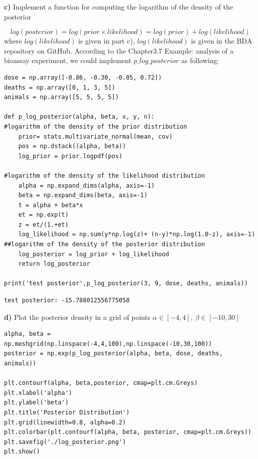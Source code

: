 \documentclass{article}
\begin{document}
\textbf{c)} Implement a function for computing the logarithm of the density of the posterior

\begin{equation}
log(posterior)=log(prior\times likelihood)=log(prior)+log(likelihood)
\end{equation}
where $log(likelihood)$ is given in part c), $log(likelihood)$ is given in the BDA repository on GitHub. According to the Chapter3.7 Example: analysis of a bioassay experiment, we could implement $p\_log\_posterior$ as following: 
\begin{verbatim}  
dose = np.array([-0.86, -0.30, -0.05, 0.72])
deaths = np.array([0, 1, 3, 5])
animals = np.array([5, 5, 5, 5])

def p_log_posterior(alpha, beta, x, y, n):
#logarithm of the density of the prior distribution 
    prior= stats.multivariate_normal(mean, cov)
    pos = np.dstack((alpha, beta))
    log_prior = prior.logpdf(pos)
    
#logarithm of the density of the likelihood distribution 
    alpha = np.expand_dims(alpha, axis=-1)
    beta = np.expand_dims(beta, axis=-1)
    t = alpha + beta*x
    et = np.exp(t)
    z = et/(1.+et)
    log_likelihood = np.sum(y*np.log(z)+ (n-y)*np.log(1.0-z), axis=-1)
##logarithm of the density of the posterior distribution 
    log_posterior = log_prior + log_likelihood
    return log_posterior 
    
print('test posterior',p_log_posterior(3, 9, dose, deaths, animals))
\end{verbatim}

\begin{verbatim}
test posterior: -15.788012556775058
\end{verbatim}

\textbf{d)} Plot the posterior density in a grid of points $\alpha\in[-4,4],\ \beta\in[-10,30]$\\


\begin{verbatim}      
alpha, beta = np.meshgrid(np.linspace(-4,4,100),np.linspace(-10,30,100))
posterior = np.exp(p_log_posterior(alpha, beta, dose, deaths, animals))

plt.contourf(alpha, beta,posterior, cmap=plt.cm.Greys)
plt.xlabel('alpha')
plt.ylabel('beta')
plt.title('Posterior Distribution')
plt.grid(linewidth=0.8, alpha=0.2)
plt.colorbar(plt.contourf(alpha, beta, posterior, cmap=plt.cm.Greys))
plt.savefig('./log_posterior.png')
plt.show()
\end{verbatim}
\end{document}
